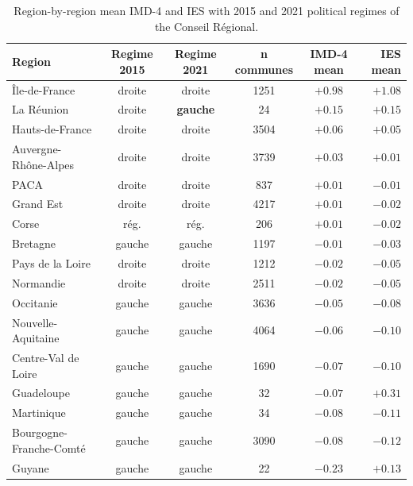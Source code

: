 \documentclass[11pt,a4paper]{article}
\begin{document}
\begin{table}[H]
\centering
\caption{Region-by-region mean IMD-4 and IES with 2015 and 2021
political regimes of the Conseil R\'egional.}
\label{tab:regional}
\small
\begin{tabular}{@{}lccccr@{}}
\toprule
Region & Regime 2015 & Regime 2021 & n communes & IMD-4 mean & IES mean \\
\midrule
\^Ile-de-France                & droite       & droite       &  1251 & $+0.98$ & $+1.08$ \\
La R\'eunion                   & droite       & \textbf{gauche} & 24 & $+0.15$ & $+0.15$ \\
Hauts-de-France                & droite       & droite       &  3504 & $+0.06$ & $+0.05$ \\
Auvergne-Rh\^one-Alpes         & droite       & droite       &  3739 & $+0.03$ & $+0.01$ \\
PACA                           & droite       & droite       &   837 & $+0.01$ & $-0.01$ \\
Grand Est                      & droite       & droite       &  4217 & $+0.01$ & $-0.02$ \\
Corse                          & r\'eg.       & r\'eg.       &   206 & $+0.01$ & $-0.02$ \\
Bretagne                       & gauche       & gauche       &  1197 & $-0.01$ & $-0.03$ \\
Pays de la Loire               & droite       & droite       &  1212 & $-0.02$ & $-0.05$ \\
Normandie                      & droite       & droite       &  2511 & $-0.02$ & $-0.05$ \\
Occitanie                      & gauche       & gauche       &  3636 & $-0.05$ & $-0.08$ \\
Nouvelle-Aquitaine             & gauche       & gauche       &  4064 & $-0.06$ & $-0.10$ \\
Centre-Val de Loire            & gauche       & gauche       &  1690 & $-0.07$ & $-0.10$ \\
Guadeloupe                     & gauche       & gauche       &    32 & $-0.07$ & $+0.31$ \\
Martinique                     & gauche       & gauche       &    34 & $-0.08$ & $-0.11$ \\
Bourgogne-Franche-Comt\'e      & gauche       & gauche       &  3090 & $-0.08$ & $-0.12$ \\
Guyane                         & gauche       & gauche       &    22 & $-0.23$ & $+0.13$ \\
\bottomrule
\end{tabular}
\end{table}
\end{document}
